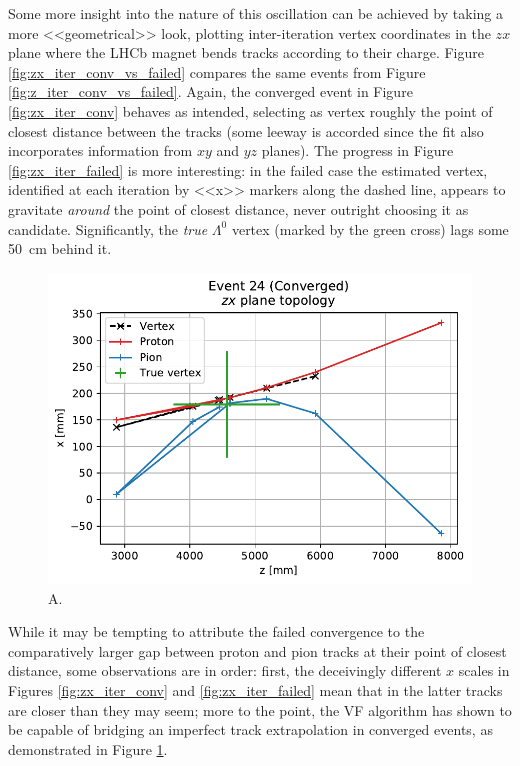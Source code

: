 Some more insight into the nature of this oscillation can be achieved by taking a more <<geometrical>> look, plotting inter-iteration vertex coordinates in the $zx$ plane where the LHCb magnet bends tracks according to their charge.
Figure \ref{fig:zx_iter_conv_vs_failed} compares the same events from Figure \ref{fig:z_iter_conv_vs_failed}.
Again, the converged event in Figure \ref{fig:zx_iter_conv} behaves as intended, selecting as vertex roughly the point of closest distance between the tracks (some leeway is accorded since the fit also incorporates information from $xy$ and $yz$ planes).
The progress in Figure \ref{fig:zx_iter_failed} is more interesting: in the failed case the estimated vertex, identified at each iteration by <<x>> markers along the dashed line, appears to gravitate \textit{around} the point of closest distance, never outright choosing it as candidate.
Significantly, the \textit{true} $\Lambda^0$ vertex (marked by the green cross) lags some \SI{50}{\centi\meter} behind it.

\begin{figure}
	\centering
	\includegraphics[width=.6\textwidth]{graphics/03-vertex_reconstruction/evt_conv_backstep_zx_iter.pdf}
	\caption{A.}
	\label{fig:zx_iter_conv_backstep}
\end{figure}

While it may be tempting to attribute the failed convergence to the comparatively larger gap between proton and pion tracks at their point of closest distance, some observations are in order:
first, the deceivingly different $x$ scales in Figures \ref{fig:zx_iter_conv} and \ref{fig:zx_iter_failed} mean that in the latter tracks are closer than they may seem;
more to the point, the VF algorithm has shown to be capable of bridging an imperfect track extrapolation in converged events, as demonstrated in Figure \ref{fig:zx_iter_conv_backstep}.

